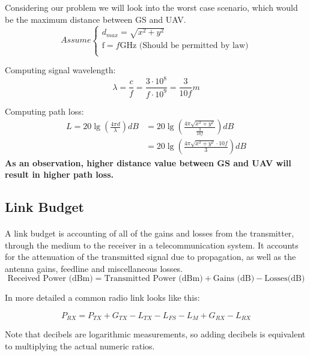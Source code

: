 Considering our problem we will look into the worst case scenario, which would be the maximum distance between GS and UAV. 
\begin{equation*}
	Assume 
	\begin{cases}
	d_{max} = \sqrt{x^2+y^2}\\
	\text{f} = f\text{GHz (Should be permitted by law})\\
	\end{cases}
\end{equation*}

Computing signal wavelength:
\begin{equation}\label{eq:vel_freq_wavelen2}
	\lambda = \frac{c}{f} 
	        = \frac{3\cdot 10^{8}}{f\cdot 10^{9}}
	        = \frac{3}{10f}m
\end{equation}

Computing path loss:
\begin{align*}\label{eq:path_loses_calc}
	L = 20\lg\left (\frac{4\pi d}{\lambda} \right) dB 
	 &= 20\lg\left (\frac{4\pi \sqrt{x^2+y^2}}{\frac{3}{10f}} \right) dB\\ 
	 &= 20\lg\left (\frac{4\pi \sqrt{x^2+y^2}\cdot 10f}{ 3} \right) dB
\end{align*}
\noindent \textbf{As an observation, higher distance value between GS and UAV will result in higher path loss.}

\subsection{Link Budget}\label{subsec:link_budget}
\paragraph{}
A link budget is accounting of all of the gains and losses from the transmitter, through the medium  to the receiver in a telecommunication system. It accounts for the attenuation of the transmitted signal due to propagation, as well as the antenna gains, feedline and miscellaneous losses. 
\begin{equation*}\label{eq:link_budget} 
 		\text{Received Power (dBm)} = \text{Transmitted Power (dBm)} + \text{Gains (dB)} - \text{Losses(dB)}
\end{equation*}

In more detailed a common radio link looks like this:

\begin{equation*}\label{eq:link_budget} 
 		P_{RX} = P_{TX} + G_{TX} - L_{TX} - L_{FS} - L_{M} + G_{RX} - L_{RX}
\end{equation*}

Note that decibels are logarithmic measurements, so adding decibels is equivalent to multiplying the actual numeric ratios.